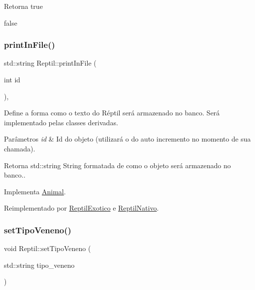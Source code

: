 \begin{DoxyReturn}{Retorna}
true 

false 
\end{DoxyReturn}
\mbox{\label{classReptil_af0fc1ff345f15480da9830e38111d181}} 
\subsubsection{\texorpdfstring{print\+In\+File()}{printInFile()}}
{\footnotesize\ttfamily std\+::string Reptil\+::print\+In\+File (\begin{DoxyParamCaption}\item[{int}]{id }\end{DoxyParamCaption})\hspace{0.3cm}{\ttfamily [protected]}, {\ttfamily [virtual]}}



Define a forma como o texto do Réptil será armazenado no banco. Será implementado pelas classes derivadas. 


\begin{DoxyParams}{Parâmetros}
{\em id} & Id do objeto (utilizará o do auto incremento no momento de sua chamada). \\
\hline
\end{DoxyParams}
\begin{DoxyReturn}{Retorna}
std\+::string String formatada de como o objeto será armazenado no banco.. 
\end{DoxyReturn}


Implementa \hyperlink{classAnimal_ac75406040726a6339932d70164cc7242}{Animal}.



Reimplementado por \hyperlink{classReptilExotico_a71312f425b92e04d8f29a856abd83f26}{Reptil\+Exotico} e \hyperlink{classReptilNativo_ac801a11c87a2847fb4b46488aa6bb789}{Reptil\+Nativo}.

\mbox{\label{classReptil_a3a91e206459f45bf2f951e914b3bc195}} 
\subsubsection{\texorpdfstring{set\+Tipo\+Veneno()}{setTipoVeneno()}}
{\footnotesize\ttfamily void Reptil\+::set\+Tipo\+Veneno (\begin{DoxyParamCaption}\item[{std\+::string}]{tipo\+\_\+veneno }\end{DoxyParamCaption})}



